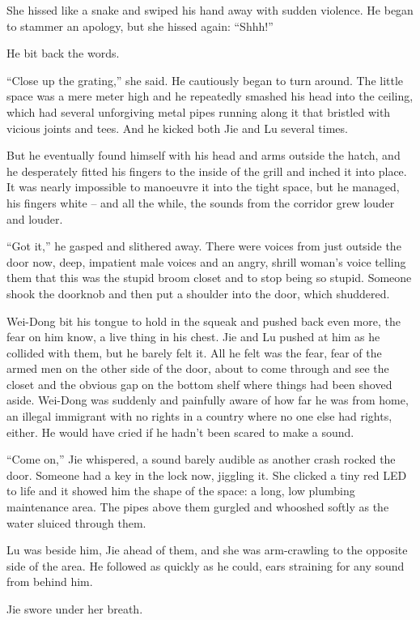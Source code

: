 She hissed like a snake and swiped his hand away with sudden
violence. He began to stammer an apology, but she hissed again:
``Shhh!''

He bit back the words.

``Close up the grating,'' she said. He cautiously began to turn
around. The little space was a mere meter high and he repeatedly
smashed his head into the ceiling, which had several unforgiving
metal pipes running along it that bristled with vicious joints and
tees. And he kicked both Jie and Lu several times.

But he eventually found himself with his head and arms outside the
hatch, and he desperately fitted his fingers to the inside of the
grill and inched it into place. It was nearly impossible to
manoeuvre it into the tight space, but he managed, his fingers
white -- and all the while, the sounds from the corridor grew
louder and louder.

``Got it,'' he gasped and slithered away. There were voices from just
outside the door now, deep, impatient male voices and an angry,
shrill woman's voice telling them that this was the stupid broom
closet and to stop being so stupid. Someone shook the doorknob and
then put a shoulder into the door, which shuddered.

Wei-Dong bit his tongue to hold in the squeak and pushed back even
more, the fear on him know, a live thing in his chest. Jie and Lu
pushed at him as he collided with them, but he barely felt it. All
he felt was the fear, fear of the armed men on the other side of
the door, about to come through and see the closet and the obvious
gap on the bottom shelf where things had been shoved aside.
Wei-Dong was suddenly and painfully aware of how far he was from
home, an illegal immigrant with no rights in a country where no one
else had rights, either. He would have cried if he hadn't been
scared to make a sound.

``Come on,'' Jie whispered, a sound barely audible as another crash
rocked the door. Someone had a key in the lock now, jiggling it.
She clicked a tiny red LED to life and it showed him the shape of
the space: a long, low plumbing maintenance area. The pipes above
them gurgled and whooshed softly as the water sluiced through
them.

Lu was beside him, Jie ahead of them, and she was arm-crawling to
the opposite side of the area. He followed as quickly as he could,
ears straining for any sound from behind him.

Jie swore under her breath.

